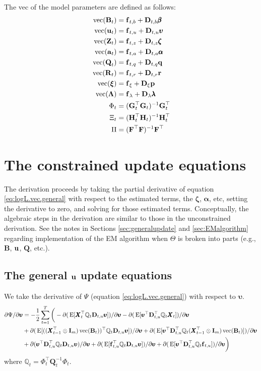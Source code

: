 \documentclass[]{article}
\def\uupsilon{\pmb{\upsilon}}
\def\llambda{\pmb{\lambda}}
\def\bbeta{\pmb{\beta}}
\def\aalpha{\pmb{\alpha}}
\def\zzeta{\pmb{\zeta}}
\def\xixi{\mbox{\boldmath $\xi$}}
\def\LAM{\mbox{\boldmath $\Lambda$}}
\def\UPS{\mbox{\boldmath $\Upsilon$}}
\def\XI{\mbox{\boldmath $\Xi$}}
\def\BB{\mbox{$\mathbf B$}}	\def\bb{\mbox{$\mathbf b$}} \def\Bb{\mbox{$\mathbf J$}} \def\Ba{\mbox{$\mathbf L$}} \def\Bm{\UPS}
\def\DD{\mbox{$\mathbf D$}}	\def\dd{\mbox{$\mathbf d$}}
\def\E{\,\textup{\textrm{E}}}
\def\FF{\mbox{$\mathbf F$}} \def\ff{\mbox{$\mathbf f$}}
\def\GG{\mbox{$\mathbf G$}}	\def\gg{\mbox{$\mathbf g$}}
\def\HH{\mbox{$\mathbf H$}}	\def\hh{\mbox{$\mathbf h$}}
\def\II{\mbox{$\mathbf I$}} \def\ii{\mbox{$\mathbf i$}}
\def\QQ{\mbox{$\mathbf Q$}}	 \def\qq{\mbox{$\mathbf q$}} \def\Qb{\mbox{$\mathbf G$}}  \def\Qm{\mathbb{Q}}
\def\RR{\mbox{$\mathbf R$}}	 \def\rr{\mbox{$\mathbf r$}} \def\Rb{\mbox{$\mathbf H$}}	\def\Rm{\mathbb{R}}
\def\XX{\mbox{$\pmb{X}$}}	\def\xx{\mbox{$\pmb{x}$}}
\def\ZZ{\mbox{$\mathbf Z$}}	\def\zz{\mbox{$\mathbf z$}}	\def\Zb{\mbox{$\mathbf M$}} \def\Za{\mbox{$\mathbf N$}} \def\Zm{\XI}
\def\vec{\,\textup{\textrm{vec}}}
\begin{document}
The vec of the model parameters are defined as follows:
\begin{equation*}
\begin{split}
\vec(\BB_t)&=\ff_{t,b}+\DD_{t,b}\bbeta\\
\vec(\uu_t) &= \ff_{t,u}+\DD_{t,u}\uupsilon\\
\vec(\ZZ_t)&=\ff_{t,z}+\DD_{t,z}\zzeta\\
\vec(\aa_t) &= \ff_{t,a}+\DD_{t,a}\aalpha\\
\vec(\QQ_t)&=\ff_{t,q}+\DD_{t,q}\qq\\
\vec(\RR_t)&=\ff_{t,r}+\DD_{t,r}\rr\\
\vec(\xixi)&=\ff_\xi+\DD_\xi\pp\\
\vec(\LAM)&=\ff_\lambda+\DD_\lambda\llambda\\
\Phi_t&=(\GG_t^\top\GG_t)^{-1}\GG_t^\top\\
\Xi_t&=(\HH_t^\top\HH_t)^{-1}\HH_t^\top\\
\Pi&=(\FF^\top\FF)^{-1}\FF^\top
\end{split}
\end{equation*}

\section{The constrained update equations}\label{sec:constrained}
The derivation proceeds by taking the partial derivative of equation \ref{eq:logL.vec.general} with respect to the estimated terms, the $\zzeta$, $\aalpha$, etc, setting the derivative to zero, and solving for those estimated terms.  Conceptually, the algebraic steps in the derivation are similar to those in  the unconstrained derivation. See the notes in Sections \ref{sec:generalupdate} and \ref{sec:EMalgorithm} regarding implementation of the EM algorithm when $\Theta$ is broken into parts (e.g., $\BB$, $\mbox{$\mathbf u$}$, $\QQ$, etc.).

\subsection{The general $\mbox{$\mathbf u$}$ update equations}
We take the derivative of $\Psi$ (equation \ref{eq:logL.vec.general}) with respect to $\uupsilon$.
\begin{equation}\label{eq:u.general1}
\begin{split}
\partial\Psi/\partial\pmb{\upsilon}
 &= - \frac{1}{2}\sum_{t=1}^T \bigg(-\partial(\E[\XX_t^\top\Qm_t\DD_{t,u}\uupsilon])/\partial\pmb{\upsilon}
 - \partial(\E[\uupsilon^\top\DD_{t,u}^\top\Qm_t\XX_t])/\partial\pmb{\upsilon} \\
&+ \partial(\E[(( \XX_{t-1}^\top \otimes \II_m)\vec(\BB_t))^\top\Qm_t\DD_{t,u}\uupsilon] )/\partial\pmb{\upsilon} 
 + \partial(\E[\uupsilon^\top\DD_{t,u}^\top\Qm_t( \XX_{t-1}^\top \otimes \II_m)\vec(\BB_t)])/\partial\pmb{\upsilon}\\
&+ \partial(\uupsilon^\top\DD_{t,u}^\top\Qm_t\DD_{t,u}\uupsilon)/\partial\pmb{\upsilon} 
+ \partial(\E[\ff_{t,u}^\top\Qm_t\DD_{t,u}\uupsilon])/\partial\pmb{\upsilon}
 + \partial(\E[\uupsilon^\top\DD_{t,u}^\top\Qm_t\ff_{t,u}])/\partial\pmb{\upsilon}
\bigg)
\end{split}
\end{equation}
where $\Qm_t = \Phi_t^\top\QQ_t^{-1}\Phi_t$.
\end{document}
